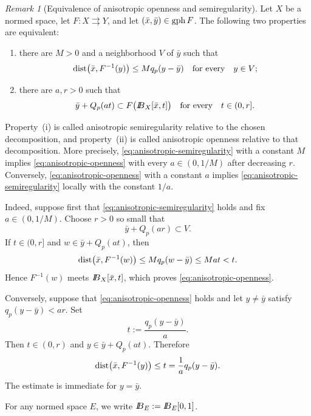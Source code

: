 \documentclass[11pt]{amsart}
\theoremstyle{definition}
\theoremstyle{remark}
\newtheorem{remark}[theorem]{Remark}
\newcommand{\tto}{\rightrightarrows}
\newcommand{\bx}{\bar x}
\newcommand{\by}{\bar y}
\newcommand{\gph}{\mathop{\rm gph}\nolimits}
\newcommand{\dist}{\mathop{\rm dist}\nolimits}
\def\ball{{I\kern -.35em B}}
\begin{document}
	\begin{remark}[Equivalence of anisotropic openness and semiregularity]
		\label{rem:anisotropic-covering-inverse-equivalence}
		Let $X$ be a normed space, let $F:X\tto Y$, and let
		$(\bx,\by)\in\gph F$.  The following two properties are equivalent:
		\begin{enumerate}[label={\rm (\roman*)}]
			\item there are $M>0$ and a neighborhood $V$ of $\by$ such that
			\begin{equation}
				\dist\bigl(\bx,F^{-1}(y)\bigr)
				\le Mq_p(y-\by)
				\quad\text{for every}\quad y\in V;
				\label{eq:anisotropic-semiregularity}
			\end{equation}
			\item there are $a,r>0$ such that
			\begin{equation}
				\by+Q_p(at)
				\subset F\bigl(\ball_X[\bx,t]\bigr)
				\quad\text{for every}\quad t\in(0,r].
				\label{eq:anisotropic-openness}
			\end{equation}
		\end{enumerate}
		Property~{\rm (i)} is called anisotropic semiregularity relative to the
		chosen decomposition, and property~{\rm (ii)} is called anisotropic openness
		relative to that decomposition. More precisely,
		\eqref{eq:anisotropic-semiregularity} with a constant
		$M$ implies \eqref{eq:anisotropic-openness} with every
		$a\in(0,1/M)$ after decreasing $r$.  Conversely,
		\eqref{eq:anisotropic-openness} with a constant $a$ implies
		\eqref{eq:anisotropic-semiregularity} locally with the constant $1/a$.
		
		Indeed, suppose first that \eqref{eq:anisotropic-semiregularity} holds
		and fix $a\in(0,1/M)$.  Choose $r>0$ so small that
		$$
		\by+Q_p(ar)\subset V.
		$$
		If $t\in(0,r]$ and $w\in\by+Q_p(at)$, then
		$$
		\dist\bigl(\bx,F^{-1}(w)\bigr)
		\le Mq_p(w-\by)
		\le Mat<t.
		$$
		Hence $F^{-1}(w)$ meets $\ball_X[\bx,t]$, which proves
		\eqref{eq:anisotropic-openness}.
		
		Conversely, suppose that \eqref{eq:anisotropic-openness} holds and let
		$y\ne\by$ satisfy $q_p(y-\by)<ar$.  Set
		$$
		t:=\frac{q_p(y-\by)}{a}.
		$$
		Then $t\in(0,r)$ and $y\in\by+Q_p(at)$.  Therefore
		$$
		\dist\bigl(\bx,F^{-1}(y)\bigr)
		\le t
		=\frac1a q_p(y-\by).
		$$
		The estimate is immediate for $y=\by$.
	\end{remark}
	
	For any normed space $E$, we write $\ball_E:=\ball_E[0,1]$.
	
\end{document}
